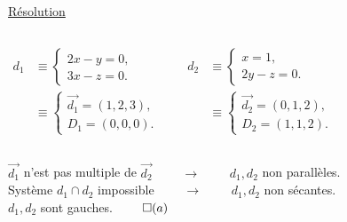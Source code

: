 \documentclass[10pt]{beamer}
\newcommand{\vect}[1] {
  \overrightarrow{#1}}
\begin{document}
{		
		
		\centering\underline{Résolution}\\ \flushleft
		\begin{columns}[c]
		\centering 
		\begin{align*}
		 d_1 &\equiv \begin{cases} 
			     2x - y = 0, \\
			     3x - z = 0.
		             \end{cases}\\
		     &\equiv \begin{cases}
			      \vect{d_1} = (1,2,3), \\
			      D_1 = (0,0,0).
		             \end{cases}     
		\end{align*}		
		
		\centering 
		\begin{align*}
		 d_2&\equiv \begin{cases} 
		       x =1, \\
	               2y - z = 0.
		            \end{cases} \\
		    &\equiv \begin{cases}
			    \vect{d_2} = (0,1,2), \\
			    D_2 = (1,1,2).
			    \end{cases}
		\end{align*}
		\end{columns}  \medskip
		$\vect{d_1}$ n'est pas multiple de $\vect{d_2}$ $\qquad \rightarrow \qquad$ $d_1,d_2$ non parallèles. \\ \medskip
		Système $d_1 \cap d_2$ impossible $\qquad \rightarrow \qquad$ $d_1,d_2$ non sécantes. \\ \medskip
		$d_1,d_2$ sont gauches. \hfill $\qed(a)$

    }
\end{document}
